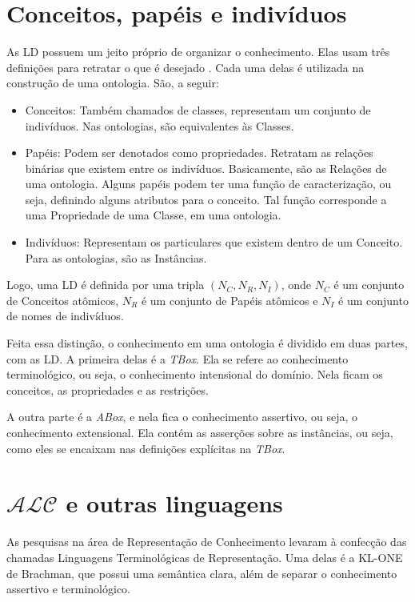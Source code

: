 \section{Conceitos, papéis e indivíduos}

As LD possuem um jeito próprio de organizar o conhecimento. Elas usam três definições para retratar o que é desejado \cite{logicaMatos}. Cada uma delas é utilizada na construção de uma ontologia. São, a seguir:

\begin{itemize}
	\item Conceitos: Também chamados de classes, representam um conjunto de indivíduos. Nas ontologias, são equivalentes às Classes.
	\item Papéis: Podem ser denotados como propriedades. Retratam as relações binárias que existem entre os indivíduos. Basicamente, são as Relações de uma ontologia. Alguns papéis podem ter uma função de caracterização, ou seja, definindo alguns atributos para o conceito. Tal função corresponde a uma Propriedade de uma Classe, em uma ontologia.
	\item Indivíduos: Representam os particulares que existem dentro de um Conceito. Para as ontologias, são as Instâncias.
\end{itemize}

Logo, uma LD é definida por uma tripla $ (N_C, N_R, N_I) $, onde $ N_C $ é um conjunto de Conceitos atômicos, $ N_R $ é um conjunto de Papéis atômicos e $ N_I $ é um conjunto de nomes de indivíduos.

Feita essa distinção, o conhecimento em uma ontologia é dividido em duas partes, com as LD. A primeira delas é a \textit{TBox}. Ela se refere ao conhecimento terminológico, ou seja, o conhecimento intensional do domínio. Nela ficam os conceitos, as propriedades e as restrições.

A outra parte é a \textit{ABox}, e nela fica o conhecimento assertivo, ou seja, o conhecimento extensional. Ela contém as asserções sobre as instâncias, ou seja, como eles se encaixam nas definições explícitas na \textit{TBox}.

\section{$\mathcal{ALC}$ e outras linguagens}

As pesquisas na área de Representação de Conhecimento levaram à confecção das chamadas Linguagens Terminológicas de Representação. Uma delas é a KL-ONE de Brachman, que possui uma semântica clara, além de separar o conhecimento assertivo e terminológico. %

